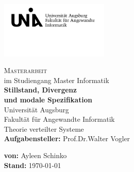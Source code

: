 \begin{titlepage}
\includegraphics[width=0.4\textwidth]{Uni_Aug_Logo_FAI_schwarz.png}
\vspace{-1cm}
\begin{center}
  \LARGE \textsc{Masterarbeit}\\
  \normalsize im Studiengang Master Informatik\\
  \vfill
  \Huge \textbf{Stillstand, Divergenz\\
  und modale Spezifikation}\\
  \vfill
  \Large Universität Augsburg\\
  Fakultät für Angewandte Informatik\\
  Theorie verteilter Systeme\\
  \vspace{1.5cm}
  \rmfamily \large \textbf{Aufgabensteller:} Prof.\;Dr.\;Walter Vogler
\end{center}
\vspace{1cm}
\large \textbf{%
  von:}
Ayleen Schinko\\
\textbf{%
  Stand:}
\today\\
\end{titlepage}
